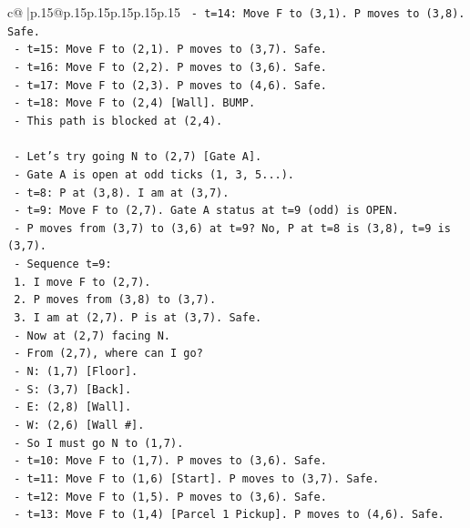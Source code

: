 \documentclass{article}
\begin{document}
{\begin{supertabular}{c@{$\;$}|p{.15\linewidth}@{}p{.15\linewidth}p{.15\linewidth}p{.15\linewidth}p{.15\linewidth}p{.15\linewidth}}
{{{\texttt{     {-} t=14: Move F to (3,1). P moves to (3,8). Safe.} \\
\texttt{     {-} t=15: Move F to (2,1). P moves to (3,7). Safe.} \\
\texttt{     {-} t=16: Move F to (2,2). P moves to (3,6). Safe.} \\
\texttt{     {-} t=17: Move F to (2,3). P moves to (4,6). Safe.} \\
\texttt{     {-} t=18: Move F to (2,4) {[}Wall{]}. BUMP.} \\
\texttt{     {-} This path is blocked at (2,4).} \\
\\ 
\texttt{   {-} Let's try going N to (2,7) {[}Gate A{]}.} \\
\texttt{     {-} Gate A is open at odd ticks (1, 3, 5...).} \\
\texttt{     {-} t=8: P at (3,8). I am at (3,7).} \\
\texttt{     {-} t=9: Move F to (2,7). Gate A status at t=9 (odd) is OPEN.} \\
\texttt{     {-} P moves from (3,7) to (3,6) at t=9? No, P at t=8 is (3,8), t=9 is (3,7).} \\
\texttt{     {-} Sequence t=9:} \\
\texttt{       1. I move F to (2,7).} \\
\texttt{       2. P moves from (3,8) to (3,7).} \\
\texttt{       3. I am at (2,7). P is at (3,7). Safe.} \\
\texttt{     {-} Now at (2,7) facing N.} \\
\texttt{     {-} From (2,7), where can I go?} \\
\texttt{       {-} N: (1,7) {[}Floor{]}.} \\
\texttt{       {-} S: (3,7) {[}Back{]}.} \\
\texttt{       {-} E: (2,8) {[}Wall{]}.} \\
\texttt{       {-} W: (2,6) {[}Wall \#{]}.} \\
\texttt{     {-} So I must go N to (1,7).} \\
\texttt{     {-} t=10: Move F to (1,7). P moves to (3,6). Safe.} \\
\texttt{     {-} t=11: Move F to (1,6) {[}Start{]}. P moves to (3,7). Safe.} \\
\texttt{     {-} t=12: Move F to (1,5). P moves to (3,6). Safe.} \\
\texttt{     {-} t=13: Move F to (1,4) {[}Parcel 1 Pickup{]}. P moves to (4,6). Safe.} \\
}}}
\end{supertabular}}
\end{document}
